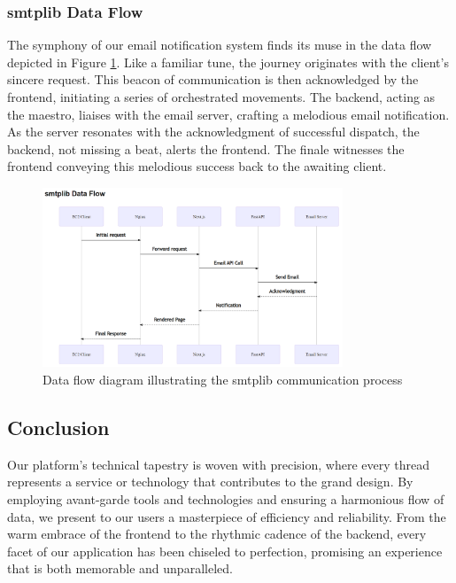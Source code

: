 \documentclass[12pt]{article}
\begin{document}
\subsubsection{smtplib Data Flow}

The symphony of our email notification system finds its muse in the data flow depicted in Figure \ref{fig:smtplib_flow}. Like a familiar tune, the journey originates with the client's sincere request. This beacon of communication is then acknowledged by the frontend, initiating a series of orchestrated movements. The backend, acting as the maestro, liaises with the email server, crafting a melodious email notification. As the server resonates with the acknowledgment of successful dispatch, the backend, not missing a beat, alerts the frontend. The finale witnesses the frontend conveying this melodious success back to the awaiting client.

\begin{figure}[ht]
	\centering
	\includegraphics[width=0.8\textwidth]{smtplib_flow.png}
	\caption{Data flow diagram illustrating the smtplib communication process}
	\label{fig:smtplib_flow}
\end{figure}

\subsection{Conclusion}

Our platform's technical tapestry is woven with precision, where every thread represents a service or technology that contributes to the grand design. By employing avant-garde tools and technologies and ensuring a harmonious flow of data, we present to our users a masterpiece of efficiency and reliability. From the warm embrace of the frontend to the rhythmic cadence of the backend, every facet of our application has been chiseled to perfection, promising an experience that is both memorable and unparalleled.
\end{document}
